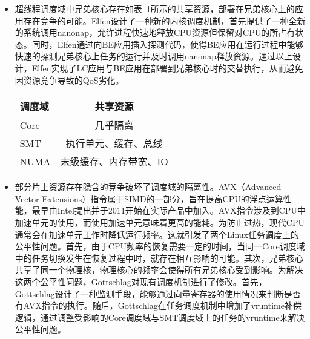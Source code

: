 \begin{itemize}
    \item 超线程调度域中兄弟核心存在如表~\ref{tab:resourcesharing}所示的共享资源，部署在兄弟核心上的应用存在竞争的可能。Elfen\citep{yang2016elfen}设计了一种新的内核调度机制，首先提供了一种全新的系统调用nanonap，允许进程快速地释放CPU资源但保留对CPU的所占有状态。同时，Elfen通过向BE应用插入探测代码，使得BE应用在运行过程中能够快速的探测兄弟核心上任务的运行并及时调用nanonap释放资源。通过以上设计，Elfen实现了LC应用与BE应用在部署到兄弟核心时的交替执行，从而避免因资源竞争导致的QoS劣化。 

    \begin{table}[!htbp]
        \label{tab:resourcesharing}
        \footnotesize%
        \setlength{\tabcolsep}{4pt}%
        \renewcommand{\arraystretch}{1.5}%
        \centering
        \begin{tabular}{lc}
            \hline
            调度域 & 共享资源\\
            \hline
            Core & 几乎隔离\\
            SMT & 执行单元、缓存、总线\\
            NUMA & 末级缓存、内存带宽、IO\\
            \hline
        \end{tabular}
    \end{table}

    \item 部分片上资源存在隐含的竞争破坏了调度域的隔离性。AVX（Advanced Vector Extensions）指令属于SIMD的一部分，旨在提高CPU的浮点运算性能，最早由Intel提出并于2011开始在实际产品中加入。AVX指令涉及到CPU中加速单元的使用，而使用加速单元意味着更高的能耗。为防止过热，现代CPU通常会在加速单元工作时降低运行频率。这就引发了两个Linux任务调度上的公平性问题。首先，由于CPU频率的恢复需要一定的时间，当同一Core调度域中的任务切换发生在恢复过程中时，就存在相互影响的可能。其次，兄弟核心共享了同一个物理核，物理核心的频率会使得所有兄弟核心受到影响。为解决这两个公平性问题，Gottschlag\citep{gottschlag2020avx}对现有调度机制进行了修改。首先，Gottschlag设计了一种监测手段，能够通过向量寄存器的使用情况来判断是否有AVX指令的执行。随后，Gottschlag在任务调度机制中增加了vruntime补偿逻辑，通过调整受影响的Core调度域与SMT调度域上的任务的vruntime来解决公平性问题。
\end{itemize}

